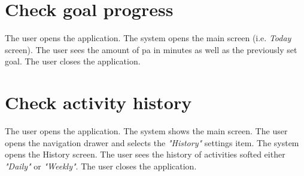 \section*{Check goal progress}
    The user opens the application. The system opens the main screen (i.e. \textit{Today} screen). The user sees the amount of \gls{pa} in minutes as well as the previously set goal. The user closes the application.
    
\section*{Check activity history}
    The user opens the application. The system shows the main screen. The user opens the navigation drawer and selects the \textit{"History"} settings item. The system opens the History screen. The user sees the history of activities softed either \textit{"Daily"} or \textit{"Weekly"}. The user closes the application. 